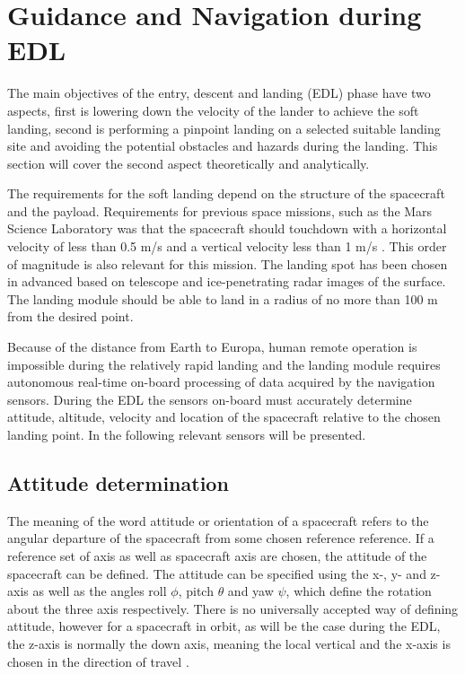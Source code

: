 \section{Guidance and Navigation during EDL}

The main objectives of the entry, descent and landing (EDL) phase have two aspects, first is lowering down the velocity of the lander to achieve the soft landing, second is performing a pinpoint landing on a selected suitable landing site and avoiding the potential obstacles and hazards during the landing. This section will cover the second aspect theoretically and analytically. 

The requirements for the soft landing depend on the structure of the spacecraft and the payload. Requirements for previous space missions, such as the Mars Science Laboratory was that the spacecraft should touchdown with a horizontal velocity of less than 0.5 m/s and a vertical velocity less than 1 m/s \cite{alhat}. This order of magnitude is also relevant for this mission. The landing spot has been chosen in advanced based on telescope and ice-penetrating radar images of the surface. The landing module should be able to land in a radius of no more than 100 m from the desired point. 

Because of the distance from Earth to Europa, human remote operation is impossible during the relatively rapid landing and the landing module requires autonomous real-time on-board processing of data acquired by the navigation sensors. During the EDL the sensors on-board must accurately determine attitude, altitude, velocity and location of the spacecraft relative to the chosen landing point. In the following relevant sensors will be presented. 

\subsection{Attitude determination}

The meaning of the word attitude or orientation of a spacecraft refers to the angular departure of the spacecraft from some chosen reference reference. If a reference set of axis as well as spacecraft axis are chosen, the attitude of the spacecraft can be defined. The attitude can be specified using the x-, y- and z- axis as well as the angles roll $\phi$, pitch $\theta$ and yaw $\psi$, which define the rotation about the three axis respectively. There is no universally accepted way of defining attitude, however for a spacecraft in orbit, as will be the case during the EDL, the z-axis is normally the down axis, meaning the local vertical and the x-axis is chosen in the direction of travel \citep{spacecraft}.

